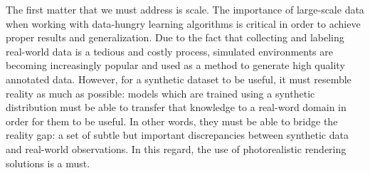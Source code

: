 The first matter that we must address is scale. The importance of large-scale data when working with data-hungry learning algorithms is critical in order to achieve proper results and generalization. Due to the fact that collecting and labeling real-world data is a tedious and costly process, simulated environments are becoming increasingly popular and used as a method to generate high quality annotated data. However, for a synthetic dataset to be useful, it must resemble reality as much as possible: models which are trained using a synthetic distribution must be able to transfer that knowledge to a real-word domain in order for them to be useful. In other words, they must be able to bridge the reality gap: a set of subtle but important discrepancies between synthetic data and real-world observations. In this regard, the use of photorealistic rendering solutions is a must.

\clearpage

